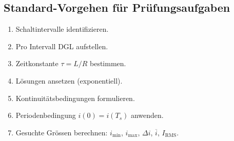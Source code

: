 \subsection{Standard-Vorgehen für Prüfungsaufgaben}

\begin{enumerate}
    \item Schaltintervalle identifizieren.
    \item Pro Intervall DGL aufstellen.
    \item Zeitkonstante $\tau=L/R$ bestimmen.
    \item Lösungen ansetzen (exponentiell).
    \item Kontinuitätsbedingungen formulieren.
    \item Periodenbedingung $i(0)=i(T_s)$ anwenden.
    \item Gesuchte Grössen berechnen: $i_{\min}$, $i_{\max}$, $\Delta i$, $\overline{i}$, $I_{\mathrm{RMS}}$.
\end{enumerate}

